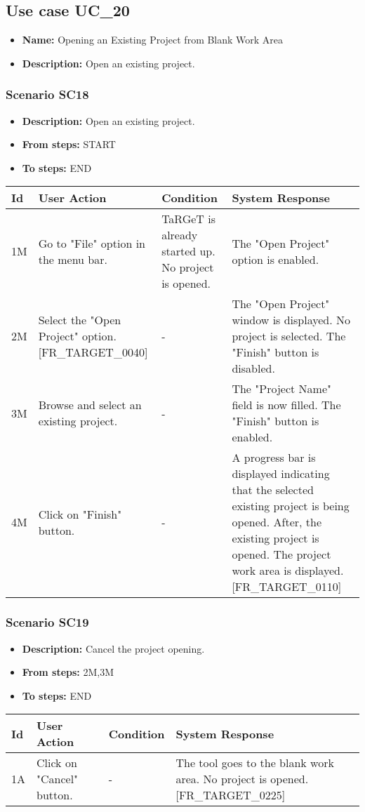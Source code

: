 \documentclass[a4paper,11pt]{article}
\newcommand{\bl}{\\ \hline}
\begin{document}
\subsection*{Use case UC_20}
\begin{itemize}
\item {\bf Name: }Opening an Existing Project from Blank Work Area
\item {\bf Description: }Open an existing project.
\end{itemize}
\subsubsection*{Scenario SC18}
\begin{itemize}
\item {\bf Description:} Open an existing project.
\item {\bf From steps:} START
\item {\bf To steps:} END
\end{itemize}
\begin{tabular}{|p{0.4in}|p{1.5in}|p{1.5in}|p{1.5in}|}
\hline
Id & User Action & Condition & System Response \bl 
1M & Go to "File" option in the menu bar.   & TaRGeT is already started up. No project is opened.
					 & The "Open Project" option is enabled. \bl
2M & Select the "Open Project" option. [FR_TARGET_0040] & - & The "Open Project" window is displayed. No project is
						selected. The "Finish" button is disabled.\bl
3M & Browse and select an existing project. & - & The "Project Name" field is now filled. The "Finish"
						button is enabled.\bl
4M & Click on "Finish" button. & - & A progress bar is displayed indicating that the selected
						existing project is being opened. After, the existing project is
						opened. The project work area is displayed. [FR_TARGET_0110]
					\bl
\end{tabular}
\subsubsection*{Scenario SC19}
\begin{itemize}
\item {\bf Description:} Cancel the project opening.
\item {\bf From steps:} 2M,3M
\item {\bf To steps:} END
\end{itemize}
\begin{tabular}{|p{0.4in}|p{1.5in}|p{1.5in}|p{1.5in}|}
\hline
Id & User Action & Condition & System Response \bl 
1A & Click on "Cancel" button. & - & The tool goes to the blank work area. No project is
						opened. [FR_TARGET_0225]\bl
\end{tabular}
\end{document}
